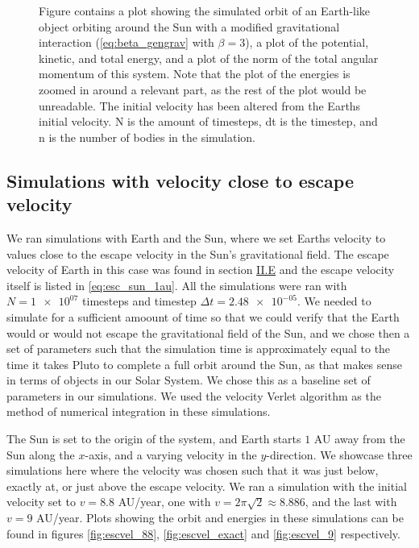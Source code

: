 \documentclass[reprint,english,notitlepage]{revtex4-1}  %
\begin{document}
\begin{figure}[H]
\caption{Figure contains a plot showing the simulated orbit of an Earth-like object orbiting around the Sun with a modified gravitational interaction (\eqref{eq:beta_gengrav} with $\beta = 3$), a plot of the potential, kinetic, and total energy, and a plot of the norm of the total angular momentum of this system. Note that the plot of the energies is zoomed in around a relevant part, as the rest of the plot would be unreadable. The initial velocity has been altered from the Earths initial velocity. N is the amount of timesteps, dt is the timestep, and n is the number of bodies in the simulation.}
\label{fig:beta3_peturbed}
\end{figure}


\subsection{Simulations with velocity close to escape velocity} \label{sec:IV:d}

We ran simulations with Earth and the Sun, where we set Earths velocity to values close to the escape velocity in the Sun's gravitational field. The escape velocity of Earth in this case was found in section \hyperref[sec:II:e]{II.E} and the escape velocity itself is listed in \eqref{eq:esc_sun_1au}. All the simulations were ran with $N = \num{1e+07}$ timesteps and timestep $\Delta t = \num{2.48e-05}$. We needed to simulate for a sufficient amoount of time so that we could verify that the Earth would or would not escape the gravitational field of the Sun, and we chose then a set of parameters such that the simulation time is approximately equal to the time it takes Pluto to complete a full orbit around the Sun, as that makes sense in terms of objects in our Solar System. We chose this as a baseline set of parameters in our simulations. We used the velocity Verlet algorithm as the method of numerical integration in these simulations.

The Sun is set to the origin of the system, and Earth starts $1$ AU away from the Sun along the $x$-axis, and a varying velocity in the $y$-direction. We showcase three simulations here where the velocity was chosen such that it was just below, exactly at, or just above the escape velocity. We ran a simulation with the initial velocity set to $v = 8.8$ AU/year, one with $v = 2\pi \sqrt{2} \approx 8.886$, and the last with $v = 9$ AU/year. Plots showing the orbit and energies in these simulations can be found in figures \ref{fig:escvel_88}, \ref{fig:escvel_exact} and \ref{fig:escvel_9} respectively.
\end{document}
